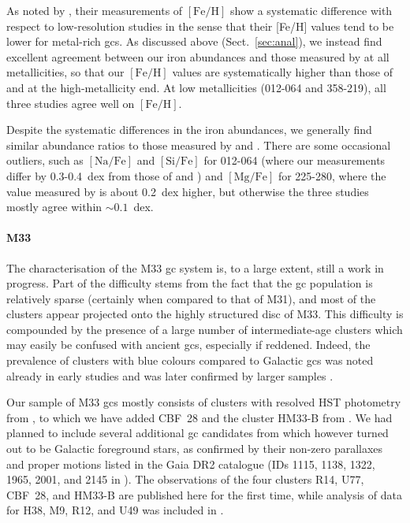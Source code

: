 \documentclass{aa}
\begin{document}
As noted by , their measurements of $\mathrm{[Fe/H]}$ show a systematic difference with respect to low-resolution studies in the sense that their [Fe/H] values tend to be lower for metal-rich \acp{gc}.
As discussed above (Sect.~\ref{sec:anal}), we instead find excellent agreement between our iron abundances and those measured by \citet{Caldwell2011} at all metallicities, so that our $\mathrm{[Fe/H]}$ values are systematically higher than those of  and  at the high-metallicity end. At low metallicities (012-064 and 358-219), all three studies agree well on $\mathrm{[Fe/H]}$. 

Despite the systematic differences in the iron abundances, we generally find similar abundance ratios to those measured by  and . There are some occasional outliers, such as $\mathrm{[Na/Fe]}$ and $\mathrm{[Si/Fe]}$ for 012-064 (where our measurements differ by 0.3-0.4~dex  from those of  and ) and $\mathrm{[Mg/Fe]}$ for 225-280, where the value measured by  is about 0.2~dex higher, but otherwise the three studies mostly agree within $\sim0.1$~dex.

\paragraph{M33}

The characterisation of the M33 \ac{gc} system is, to a large extent, still a work in progress. Part of the difficulty stems from the fact that the \ac{gc} population is relatively sparse (certainly when compared to that of M31), and most of the clusters appear projected onto the highly structured disc of M33. 
This difficulty is compounded by the presence of a large number of intermediate-age clusters which may easily be confused with ancient \acp{gc}, especially if reddened.
Indeed, the prevalence of clusters with blue colours compared to Galactic \acp{gc} was noted already in early studies \citep{Hiltner1960,Kron1960} and was later confirmed by larger samples \citep{Melnick1978,Christian1982}.

Our sample of M33 \acp{gc} mostly consists of clusters with resolved HST photometry from  \citet{Sarajedini2000}, to which we have added CBF~28 \citep{Chandar1999} and the cluster HM33-B from \citet{Huxor2009}. 
We had planned to include several additional \ac{gc} candidates from \citet{Beasley2015} which however turned out to be Galactic foreground stars, as confirmed by their non-zero parallaxes and proper motions listed in the Gaia DR2 catalogue (IDs 1115, 1138, 1322, 1965, 2001, and 2145 in \citealt{Beasley2015}). The observations of the four clusters R14, U77, CBF~28, and HM33-B are published here for the first time, while analysis of data for H38, M9, R12, and U49 was included in \citet{Larsen2018}.
\end{document}
